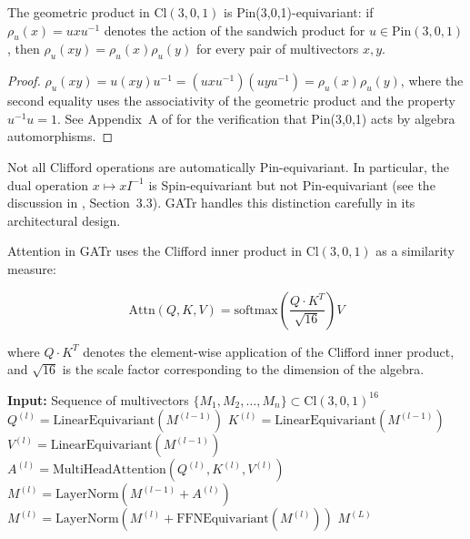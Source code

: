 \begin{theorem}\label{thm:equivarianza_automatica_gatr}
The geometric product in $\text{Cl}(3,0,1)$ is Pin(3,0,1)-equivariant: if $\rho_u(x) = uxu^{-1}$ denotes the action of the sandwich product for $u \in \text{Pin}(3,0,1)$, then $\rho_u(xy) = \rho_u(x)\rho_u(y)$ for every pair of multivectors $x, y$.
\end{theorem}

\begin{proof}
$\rho_u(xy) = u(xy)u^{-1} = (uxu^{-1})(uyu^{-1}) = \rho_u(x)\rho_u(y)$, where the second equality uses the associativity of the geometric product and the property $u^{-1}u = 1$. See Appendix~A of \citet{brehmer2023geometric} for the verification that Pin(3,0,1) acts by algebra automorphisms.
\end{proof}

\begin{remark}
Not all Clifford operations are automatically Pin-equivariant. In particular, the dual operation $x \mapsto xI^{-1}$ is Spin-equivariant but not Pin-equivariant (see the discussion in \citet{brehmer2023geometric}, Section~3.3). GATr handles this distinction carefully in its architectural design.
\end{remark}

\begin{definition}\label{def:atencion_geometrica_gatr}
Attention in GATr uses the Clifford inner product in $\text{Cl}(3,0,1)$ as a similarity measure:

\begin{equation}
    \text{Attn}(Q, K, V) = \text{softmax}\left(\frac{Q \cdot K^T}{\sqrt{16}}\right) V
\end{equation}

where $Q \cdot K^T$ denotes the element-wise application of the Clifford inner product, and $\sqrt{16}$ is the scale factor corresponding to the dimension of the algebra.
\end{definition}

\begin{algorithm}[H]
\caption{GATr Forward Pass}
\label{alg:forward_gatr}
\begin{algorithmic}[1]
    \State \textbf{Input:} Sequence of multivectors $\{M_1, M_2, \ldots, M_n\} \subset \text{Cl}(3,0,1)^{16}$
        \State $Q^{(l)} = \text{LinearEquivariant}(M^{(l-1)})$
        \State $K^{(l)} = \text{LinearEquivariant}(M^{(l-1)})$
        \State $V^{(l)} = \text{LinearEquivariant}(M^{(l-1)})$
        \State $A^{(l)} = \text{MultiHeadAttention}(Q^{(l)}, K^{(l)}, V^{(l)})$
        \State $M^{(l)} = \text{LayerNorm}(M^{(l-1)} + A^{(l)})$
        \State $M^{(l)} = \text{LayerNorm}(M^{(l)} + \text{FFNEquivariant}(M^{(l)}))$
    \EndFor
    \State \Return $M^{(L)}$
\end{algorithmic}
\end{algorithm}

